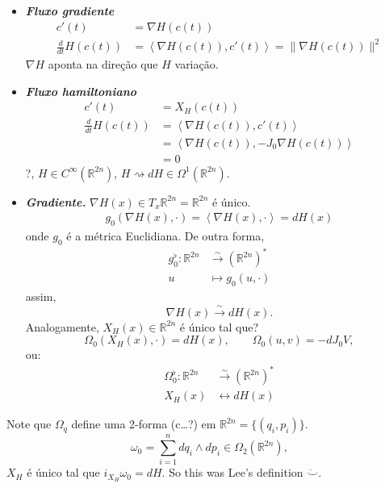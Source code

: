\begin{itemize}
	\item \textit{\textbf{Fluxo gradiente}}
		\begin{align*}c'(t)&=\nabla H(c(t))\\
			\frac{d}{dt}H(c(t))&=\left<\nabla H(c(t)),c'(t)\right> =\|\nabla H(c(t))\|^{2}
\end{align*}
$\nabla H$ aponta na dire\c c\~ao que $H$ varia\c c\~ao.
\item \textit{\textbf{Fluxo hamiltoniano}} 
	\begin{align*}
		c'(t)& =X_{H}(c(t))\\
		\frac{d}{dt}H(c(t))&=\left<\nabla H(c(t)),c'(t)\right> \\
		&=\left<\nabla H(c(t)),-J_{0}\nabla H(c(t))\right>\\
		&=0
	\end{align*}
	{\color{persimmon}?}, $H\in C^{\infty}(\mathbb{R}^{2n} )$, $H\rightsquigarrow dH\in \Omega^{1}(\mathbb{R}^{2n} )$.
	\item \textit{\textbf{Gradiente.}} $\nabla H(x)\in T_{x}\mathbb{R}^{2n} =\mathbb{R}^{2n}$ \'e \'unico.
\begin{align*}
	g_{0}(\nabla H(x),\cdot )=\left<\nabla H(x),\cdot \right> =dH(x)
\end{align*}
onde $g_{0}$ \'e a m\'etrica Euclidiana. De outra forma,
\begin{align*}
	g_{0}^{\flat}:\mathbb{R}^{2n} &\overset{\sim}{\to  } (\mathbb{R}^{2n})^{*}\\
u&\mapsto g_0(u,\cdot )
\end{align*}
assim,
\[\nabla H(x)\overset{\sim}{\to }dH(x).\]
Analogamente, $X_{H}(x)\in \mathbb{R}^{2n}$ \'e \'unico {\color{persimmon}tal que?}
\[\Omega_0(X_{H}(x),\cdot )=dH(x),\qquad \Omega_0(u,v)=-dJ_0V,\]
ou:
\begin{align*}
	\Omega_0^{\flat}: \mathbb{R}^{2n} &\overset{\sim}{\longrightarrow}(\mathbb{R}^{2n})^{*}\\
	X_{H}(x) &\longleftrightarrow dH(x) 
\end{align*}
\end{itemize}

\begin{remark}
	Note que $\Omega_{q}$ define uma 2-forma ({\color{persimmon}c…?)} em $\mathbb{R}^{2n}=\{(q_{i},p_{i})\} $.
	\[\omega_0=\sum_{i=1}^{n} dq_{i}\wedge dp_{i}\in \Omega_2(\mathbb{R}^{2n}),\]
	$X_{H}$ \'e \'unico tal que $i_{X_{H}}\omega_{0}=dH$. So this was Lee's definition $\ddot \smile$.
\end{remark}

